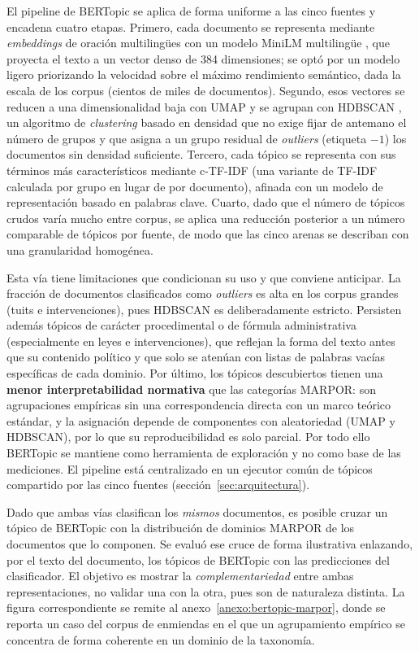 El pipeline de BERTopic se aplica de forma uniforme a las cinco fuentes y
encadena cuatro etapas. Primero, cada documento se representa mediante
\emph{embeddings} de oración multilingües con un modelo MiniLM multilingüe
\cite{reimers2019sentencebert}, que proyecta el texto a un vector denso de 384
dimensiones; se optó por un modelo
ligero priorizando la velocidad sobre el máximo rendimiento semántico, dada la
escala de los corpus (cientos de miles de documentos). Segundo, esos vectores se reducen a una dimensionalidad
baja con UMAP \cite{mcinnes2018umap} y se agrupan con HDBSCAN
\cite{mcinnes2017hdbscan}, un algoritmo de \emph{clustering} basado en densidad
que no exige fijar de antemano el número de grupos y que asigna a un grupo
residual de \emph{outliers} (etiqueta $-1$) los documentos sin densidad
suficiente. Tercero, cada tópico se representa con sus términos más
característicos mediante c-TF-IDF (una variante de TF-IDF calculada por grupo en
lugar de por documento), afinada con un modelo de representación basado en
palabras clave. Cuarto, dado que el número de tópicos crudos varía mucho entre
corpus, se aplica una reducción posterior a un número comparable de tópicos por
fuente, de modo que las cinco arenas se describan con una granularidad
homogénea.

Esta vía tiene limitaciones que condicionan su uso y que conviene anticipar. La
fracción de documentos clasificados como \emph{outliers} es alta en los corpus
grandes (tuits e intervenciones), pues HDBSCAN es deliberadamente estricto.
Persisten además tópicos de carácter procedimental o de fórmula
administrativa (especialmente en leyes e intervenciones), que reflejan la
forma del texto antes que su contenido político y que solo se atenúan con listas
de palabras vacías específicas de cada dominio. Por último, los tópicos
descubiertos tienen una \textbf{menor interpretabilidad normativa} que las
categorías MARPOR: son agrupaciones empíricas sin una correspondencia directa con
un marco teórico estándar, y la asignación depende de componentes con
aleatoriedad (UMAP y HDBSCAN), por lo que su reproducibilidad es solo parcial.
Por todo ello BERTopic se mantiene como herramienta de exploración y no como base
de las mediciones. El pipeline está centralizado en un ejecutor común de tópicos
compartido por las cinco fuentes (sección~\ref{sec:arquitectura}).

Dado que ambas vías clasifican los \emph{mismos} documentos, es posible cruzar
un tópico de BERTopic con la distribución de dominios MARPOR de los documentos
que lo componen. Se evaluó ese cruce de forma ilustrativa enlazando, por el texto
del documento, los tópicos de BERTopic con las predicciones del clasificador. El
objetivo es mostrar la \emph{complementariedad} entre ambas representaciones, no
validar una con la otra, pues son de naturaleza distinta. La figura
correspondiente se remite al anexo~\ref{anexo:bertopic-marpor}, donde se reporta
un caso del corpus de enmiendas en el que un agrupamiento empírico se concentra
de forma coherente en un dominio de la taxonomía.

